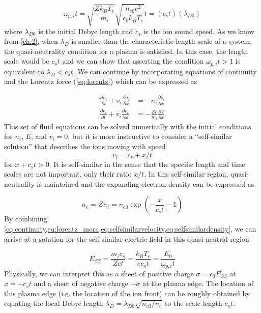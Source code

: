 \begin{equation}
	\omega_{p,i} t = \sqrt{\frac{Z k_B T_e}{m_i}} \sqrt{\frac{n_{e0} e^2}{\epsilon_0 k_B T_e}} t = (c_s t) (\lambda_{D0})
\end{equation}
where $\lambda_{D0}$ is the initial Debye length and $c_s$ is the ion sound speed. As we know from \cref{ch:2}, when $\lambda_D$ is smaller than the characteristic length scale of a system, the quasi-neutrality condition for a plasma is satisfied. In this case, the length scale would be $c_s t$ and we can show that asserting the condition $\omega_{p,i} t > 1$ is equivalent to $\lambda_D < c_s t$. We can continue by incorporating equations of continuity and the Lorentz force (\cref{eq:lorentz}) which can be expressed as 

\begin{subequations}
	\begin{align}
		\frac{\partial n_i}{\partial t} + v_i \frac{\partial n_i}{\partial x} &= - n_i \frac{\partial v_i}{\partial x} \label{eq:continuity} \\
		\frac{\partial v_i}{\partial t} + v_i \frac{\partial v_i}{\partial x} &= -\frac{Z e}{m_i} \frac{\partial V}{\partial x} \label{eq:lorentz_mora}
	\end{align}
\end{subequations}
This set of fluid equations can be solved numerically with the initial conditions for $n_i$, $E$, and $v_i = 0$, but it is more instructive to consider a ``self-similar solution'' that describes the ions moving with speed 
\begin{equation}
	v_i = c_s + x/t \label{eq:selfsimilarvelocity}
\end{equation}
for $x + c_s t > 0$. It is self-similar in the sense that the specific length and time scales are not important, only their ratio $x/t$. In this self-similar region, quasi-neutrality is maintained and the expanding electron density can be expressed as

\begin{equation}
	n_e = Z n_i = n_{e 0} \exp(-\frac{x}{c_s t} - 1) \label{eq:selfsimilardensity}
\end{equation} 
By combining \cref{eq:continuity,eq:lorentz_mora,eq:selfsimilarvelocity,eq:selfsimilardensity}, we can arrive at a solution for the self-similar electric field in this quasi-neutral region

\begin{equation}
	E_{SS} = \frac{m_i c_s}{Z e t} = \frac{k_B T_e}{e c_s t} = \frac{E_0}{\omega_{p,i} t} \label{eq:selfsimilarefield}
\end{equation}
Physically, we can interpret this as a sheet of positive charge $\sigma = \epsilon_0 E_{SS}$ at $x = - c_s t$ and a sheet of negative charge $-\sigma$ at the plasma edge. The location of this plasma edge (i.e. the location of the ion front) can be roughly obtained by equating the local Debye length $\lambda_D = \lambda_{D0} \sqrt{n_{e0}/n_e}$ to the scale length $c_s t$.

